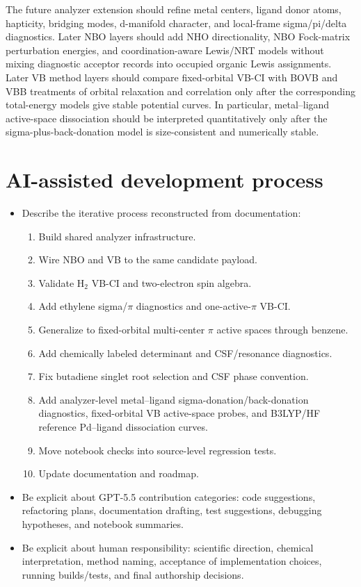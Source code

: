 \documentclass[11pt]{article}
\begin{document}
The future analyzer extension should refine metal centers, ligand donor atoms, hapticity, bridging modes, d-manifold character, and local-frame sigma/pi/delta diagnostics.  Later NBO layers should add NHO directionality, NBO Fock-matrix perturbation energies, and coordination-aware Lewis/NRT models without mixing diagnostic acceptor records into occupied organic Lewis assignments.  Later VB method layers should compare fixed-orbital VB-CI with BOVB and VBB treatments of orbital relaxation and correlation only after the corresponding total-energy models give stable potential curves.  In particular, metal--ligand active-space dissociation should be interpreted quantitatively only after the sigma-plus-back-donation model is size-consistent and numerically stable.

\section{AI-assisted development process}
\begin{itemize}[leftmargin=*]
	\item Describe the iterative process reconstructed from documentation:
		\begin{enumerate}
			\item Build shared analyzer infrastructure.
			\item Wire NBO and VB to the same candidate payload.
			\item Validate H$_2$ VB-CI and two-electron spin algebra.
			\item Add ethylene sigma/$\pi$ diagnostics and one-active-$\pi$ VB-CI.
			\item Generalize to fixed-orbital multi-center $\pi$ active spaces through benzene.
			\item Add chemically labeled determinant and CSF/resonance diagnostics.
			\item Fix butadiene singlet root selection and CSF phase convention.
			\item Add analyzer-level metal--ligand sigma-donation/back-donation diagnostics, fixed-orbital VB active-space probes, and B3LYP/HF reference Pd--ligand dissociation curves.
			\item Move notebook checks into source-level regression tests.
			\item Update documentation and roadmap.
		\end{enumerate}
	\item Be explicit about GPT-5.5 contribution categories: code suggestions, refactoring plans, documentation drafting, test suggestions, debugging hypotheses, and notebook summaries.
	\item Be explicit about human responsibility: scientific direction, chemical interpretation, method naming, acceptance of implementation choices, running builds/tests, and final authorship decisions.
\end{itemize}
\end{document}
